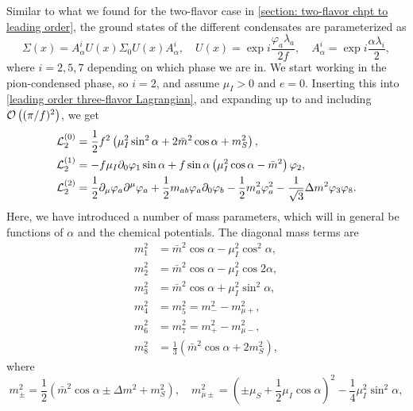 Similar to what we found for the two-flavor case in \autoref{section: two-flavor chpt to leading order}, the ground states of the different condensates are parameterized as
%
\begin{equation}
    \Sigma(x) = A^i_\alpha U(x) \Sigma_0 U(x) A^i_\alpha, \quad
    U(x) = \exp{i \frac{\varphi_a \lambda_a}{2 f}}, \quad
    A_\alpha^i = \exp{i \frac{\alpha \lambda_i}{2}},
\end{equation}
%
where $i = 2, 5, 7$ depending on which phase we are in.
We start working in the pion-condensed phase, so $i = 2$, and assume $\mu_I > 0$ and $e = 0$.
Inserting this into \autoref{leading order three-flavor Lagrangian}, and expanding up to and including $\mathcal O\left((\pi/f)^2\right)$, we get
%
\begin{align}
    \label{static three-flavor Lagrangian}
    \mathcal{L}_2^{(0)} 
    &=
    \frac{1}{2} f^2
    \left(
        \mu_I^2 \sin^2\alpha
        + 2\bar m^2 \cos\alpha
        + m_S^2
    \right), \\
    \label{linear three-flavor Lagrangian}
    \mathcal{L}_2^{(1)}
    &=
    -f \mu_I \partial_0 \varphi_1 \sin\alpha
    + f \sin\alpha
    \left(
        \mu_I^2\cos\alpha - \bar m^2
    \right)\varphi_2, \\
    \label{quadratic three-flavor Lagrangian}
    \mathcal{L}_2^{(2)} 
    &= 
    \frac{1}{2}\partial_\mu \varphi_a \partial^\mu \varphi_a
    + \frac{1}{2} m_{ab} \varphi_a\partial_0\varphi_b
    - \frac{1}{2} m_a^2 \varphi_a^2
    - \frac{1}{\sqrt{3}} \Delta m^2 \varphi_3 \varphi_8.
\end{align}
%
Here, we have introduced a number of mass parameters, which will in general be functions of $\alpha$ and the chemical potentials.
The diagonal mass terms are
%
\begingroup
\allowdisplaybreaks
\begin{align}
    \label{m1}
    m_1^2 &=  \bar m^2\cos\alpha - \mu_I^2 \cos^2\alpha,\\
    m_2^2 &= \bar m^2\cos\alpha - \mu_I^2 \cos2\alpha, \\
    m_3^2 &= \bar m^2\cos\alpha + \mu_I^2 \sin^2\alpha, \\
    m_4^2 &= m_5^2 = m_-^2 - m_{\mu+}^2, \\
    m_6^2 &= m_7^2 = m_+^2 - m^2_{\mu-}, \\
    \label{m8}
    m_8^2 &= \frac{1}{3} (\bar m^2 \cos\alpha + 2 m_S^2),
\end{align}
\endgroup
%
where
%
\begin{equation}
    \label{mass terms in pion condensate}
    m_\pm^2 = \frac{1}{2} (\bar m^2 \cos\alpha \pm \Delta m^2 + m_S^2),
    \quad
    m^2_{\mu\pm } = \left(\pm \mu_S + \frac{1}{2}\mu_I\cos\alpha \right)^2 
    - \frac{1}{4}\mu_I^2 \sin^2\alpha,
\end{equation}
